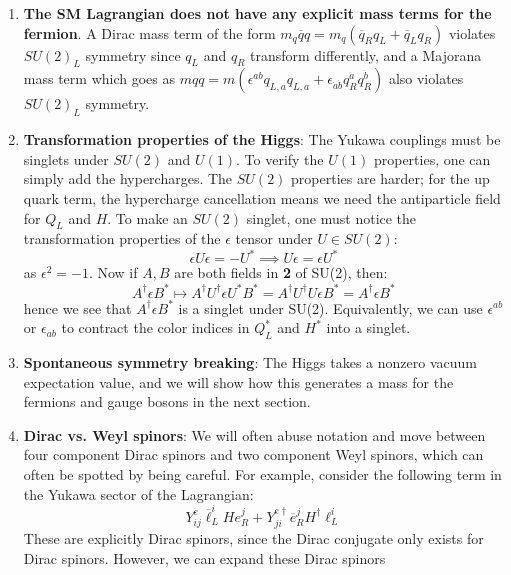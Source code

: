 \documentclass[11pt, oneside]{article}   	%
\theoremstyle{definition}
\numberwithin{equation}{subsection}		%
\begin{document}
\begin{enumerate}
	\item \textbf{The SM Lagrangian does not have any explicit mass terms for the fermion}. A Dirac mass term of the form 
	$m_q \overline q q = m_q(\overline q_R q_L + \overline q_L q_R)$ violates $SU(2)_L$ symmetry since $q_L$ and $q_R$ 
	transform differently, and a Majorana mass term which goes as $mqq = m(\epsilon^{ab} q_{L, a} q_{L, a} + \epsilon_{\dot a\dot b} 
	q_R^{\dot a} q_R^{\dot b})$ also violates $SU(2)_L$ symmetry. 
	\item \textbf{Transformation properties of the Higgs}: The Yukawa couplings must be singlets under $SU(2)$ and $U(1)$. 
	To verify the $U(1)$ properties, one can simply add the hypercharges. The $SU(2)$ properties are harder; for the 
	up quark term, the hypercharge cancellation means we need the antiparticle field for $Q_L$ and $H$. To make an 
	$SU(2)$ singlet, one must notice the transformation properties of the $\epsilon$ tensor under $U\in SU(2)$:
	\begin{equation}
		\epsilon U\epsilon = - U^*\implies U\epsilon = \epsilon U^*
	\end{equation}
	as $\epsilon^2 = -1$. Now if $A, B$ are both fields in \textbf{2} of SU(2), then:
	\begin{equation}
		A^\dagger \epsilon B^* \mapsto A^\dagger U^\dagger \epsilon U^*  B^* = A^\dagger U^\dagger U \epsilon B^* = 
		A^\dagger \epsilon B^*
	\end{equation}
	hence we see that $A^\dagger \epsilon B^*$ is a singlet under SU(2). Equivalently, we can use $\epsilon^{ab}$ or $\epsilon_{ab}$ to 
	contract the color indices in $Q_L^*$ and $H^*$ into a singlet.
	\item \textbf{Spontaneous symmetry breaking}: The Higgs takes a nonzero vacuum expectation value, and we will show 
	how this generates a mass for the fermions and gauge bosons in the next section.
	\item \textbf{Dirac vs. Weyl spinors}: We will often abuse notation and move between four component Dirac spinors 
	and two component Weyl spinors, which can often be spotted by being careful. For example, consider the following term in the Yukawa 
	sector of the Lagrangian:
	\begin{equation}
		Y_{ij}^e \overline\ell_L^i H e_R^j + Y_{ji}^{e\dagger} \overline e_R^j H^\dagger \ell_L^i
	\end{equation}
	These are explicitly Dirac spinors, since the Dirac conjugate only exists for Dirac spinors. However, we can expand these Dirac spinors 

\end{enumerate}
\end{document}
